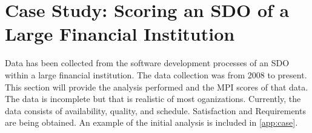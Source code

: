 \documentclass[SDSUThesis.tex]{subfiles}
\begin{document}
\section{Case Study: Scoring an SDO of a Large Financial Institution}

Data has been collected from the software development processes of
an SDO within a large financial institution.
The data collection was from 2008 to present. This section will provide the analysis performed and the MPI scores of that data. The data is incomplete but that is realistic of most oganizations.  Currently, the data
consists of availability, quality, and schedule.  Satisfaction and Requirements are being obtained. An example of the initial analysis is included in \cref{app:case}.





\end{document}
